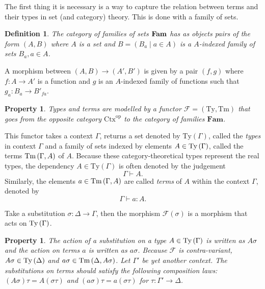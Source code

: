 \documentclass[12pt,a4paper,twoside,xetex]{book} %
\newcommand{\keyword}[1]{\emph{#1}\index{#1}}
\newtheorem{definition}[theorem]{Definition}
\newtheorem{property}[theorem]{Property}
\begin{document}
The first thing it is necessary is a way to capture the relation between terms 
and their types in set (and category) theory. This is done with a family of 
sets. 

\begin{definition}
The category of  \keyword{families of sets} $ \text{\textbf{Fam}}$ has as 
objects pairs of the form $\left(A,B\right)$ where $A$ is a set and 
$B=\left(B_{a}\mid a\in A\right)$ is a $A$-indexed family of sets $B_{a},a\in 
A$. 
\end{definition}

A morphism between $\left(A,B\right)\rightarrow\left(A',B'\right)$ is given by 
a pair $\left(f,g\right)$ where $f:A\rightarrow A'$ is a function and $g$ is an 
$A$-indexed family of functions such that $g_{a}:B_{a}\rightarrow B'_{fa}$.


\begin{property}\label{type_functor} Types and terms are modelled by a functor 
$\mathcal{F}=\left(\text{Ty},\text{Tm}\right)$ that goes from the opposite 
category $\text{Ctx}^{\text{op}}$ to the category of families $\textbf{Fam}$.
\end{property}

This functor takes a context $\Gamma$, returns a set denoted by 
$\text{Ty}\left(\Gamma\right)$, called the \keyword{types} in context $\Gamma$ 
and a family of sets indexed by elements $A\in\text{Ty}\left(\Gamma\right)$, called the terms 
$\text{Tm}\left(\Gamma,A\right)$ of $A$. Because these category-theoretical types represent the 
real types, the dependency $A \in \text{Ty}(\Gamma)$ is often denoted by the 
judgement $$\Gamma\vdash A.$$ Similarly, the elements $a\in\text{Tm}\left(\Gamma,A\right)$ are 
called \keyword{terms} of $A$ within the context $\Gamma$, denoted by 
$$\Gamma\vdash a:A.$$

 Take a substitution $\sigma:\Delta\rightarrow\Gamma$, then the morphism 
$\mathcal{F}(\sigma)$ is a morphism that acts on $\text{Ty}\left(\Gamma\right)$. 

\begin{property}\label{composition_laws}
The action of a substitution on a type $A\in\text{Ty}\left(\Gamma\right)$ is written as 
$A\sigma$ and the action on terms $a$ is written as $a\sigma$. Because 
$\mathcal{F}$ is contra-variant, $A \sigma\in \text{Ty}\left(\Delta\right)$ and $a \sigma \in 
\text{Tm}\left(\Delta,A \sigma\right)$. Let $\Gamma '$ be yet another context. The 
substitutions on terms should satisfy
the following composition laws: 
$\left(A\sigma\right)\tau=A\left(\sigma\tau\right)$
and $\left(a\sigma\right)\tau=a\left(\sigma\tau\right)$ for 
$\tau:\Gamma'\rightarrow\Delta$.
\end{property}
\end{document}
